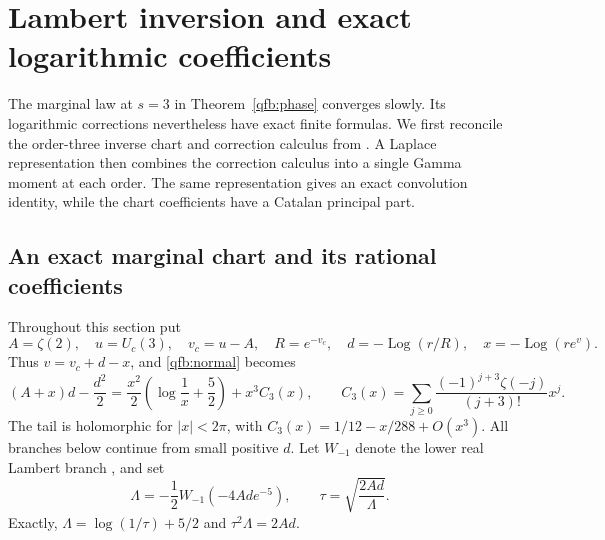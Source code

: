 \section{Lambert inversion and exact logarithmic coefficients}
\label{lmi:section}

The marginal law at $s=3$ in Theorem~\ref{qfb:phase} converges slowly.
Its logarithmic corrections nevertheless have exact finite formulas.
We first reconcile the order-three inverse chart and correction calculus
from \cite{qfb:reports}. A Laplace representation then combines the
correction calculus into a single Gamma moment at each order. The same
representation gives an exact convolution identity, while the chart
coefficients have a Catalan principal part.

\subsection{An exact marginal chart and its rational coefficients}
Throughout this section put
\[
 A=\zeta(2),\quad u=U_c(3),\quad v_c=u-A,\quad R=e^{-v_c},
 \quad d=-\operatorname{Log}(r/R),\quad x=-\operatorname{Log}(re^v).
\]
Thus $v=v_c+d-x$, and \eqref{qfb:normal} becomes
\begin{equation}\label{lmi:normal}
 (A+x)d-\frac{d^2}{2}
 =\frac{x^2}{2}\left(\log\frac1x+\frac52\right)+x^3C_3(x),
 \qquad
 C_3(x)=\sum_{j\ge0}\frac{(-1)^{j+3}\zeta(-j)}{(j+3)!}x^j.
\end{equation}
The tail is holomorphic for $|x|<2\pi$, with
$C_3(x)=1/12-x/288+O(x^3)$. All branches below continue from
small positive $d$. Let $W_{-1}$ denote the lower real Lambert
branch \cite{lmi:lambert}, and set
\begin{equation}\label{lmi:core}
 \Lambda=-\frac12W_{-1}(-4Ad e^{-5}),\qquad
 \tau=\sqrt{\frac{2Ad}{\Lambda}}.
\end{equation}
Exactly, $\Lambda=\log(1/\tau)+5/2$ and $\tau^2\Lambda=2Ad$.

